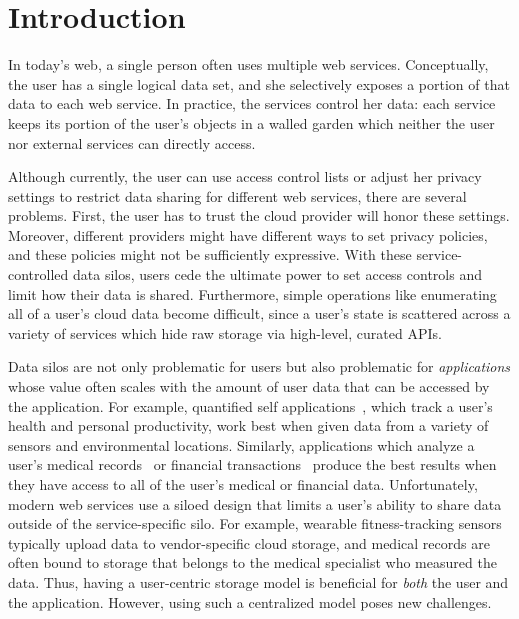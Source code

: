 \chapter{Introduction}

In today's web, a single person often 
uses multiple web services. 
Conceptually, the user has a single
logical data set, and she selectively
exposes a portion of that data to each
web service. In practice, the services
control her data: each service keeps its
portion of the user's objects in a walled
garden which neither the user nor external
services can directly access.

Although currently, the user can use access control
lists or adjust her privacy settings to 
restrict data sharing 
for different web services, there are
several problems. First, the user has to trust
the cloud provider will honor these settings.
Moreover, different providers might have 
different ways to set privacy policies,
and these policies might not be sufficiently
expressive. With these service-controlled data silos, 
users cede the
ultimate power to set access controls and
limit how their data is shared. Furthermore, simple
operations like enumerating all of a user's
cloud data become difficult, since a user's
state is scattered across a variety of services
which hide raw storage via high-level, curated
APIs.

Data silos are not only problematic for
users but also problematic for
\emph{applications} whose value often scales
with the amount of user data that can be
accessed by the application. For example,
quantified self applications~\cite{beam},
which track a user's health and personal
productivity, work best when given data
from a variety of sensors and environmental
locations. Similarly, applications which analyze a
user's medical records~\cite{lark} or financial
transactions~\cite{mint} produce the best
results when they have access to 
all of the user's medical or financial data.
Unfortunately, modern web services use
a siloed design that limits a user's ability to share 
data outside of the service-specific silo. 
For example, wearable
fitness-tracking sensors typically upload data
to vendor-specific cloud storage, and medical
records are often bound to storage that belongs
to the medical specialist who measured the
data. Thus, having a user-centric storage model
is beneficial for \emph{both} the user and the application.
However, using such a centralized model poses new challenges.


